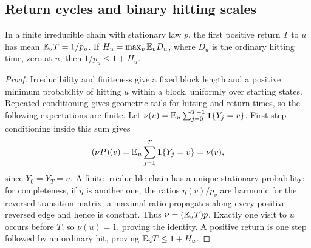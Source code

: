 \subsection{Return cycles and binary hitting scales}

\begin{lemma}\label{lem:kac}
In a finite irreducible chain with stationary law $p$, the first positive
return $T$ to $u$ has mean $\mathbb E_uT=1/p_u$.  If
$H_u=\max_v\mathbb E_vD_u$, where $D_u$ is the ordinary hitting time, zero at
$u$, then $1/p_u\le1+H_u$.
\end{lemma}
\begin{proof}
Irreducibility and finiteness give a fixed block length and a positive
minimum probability of hitting $u$ within a block, uniformly over starting
states.  Repeated conditioning gives geometric tails for hitting and return
times, so the following expectations are finite.  Let
$\nu(v)=\mathbb E_u\sum_{j=0}^{T-1}\mathbf1\{Y_j=v\}$.  First-step conditioning
inside this sum gives
\[
 (\nu P)(v)=\mathbb E_u\sum_{j=1}^{T}\mathbf1\{Y_j=v\}=\nu(v),
\]
since $Y_0=Y_T=u$.  A finite irreducible chain has a unique stationary
probability: for completeness, if $\eta$ is another one, the ratios
$\eta(v)/p_v$ are harmonic for the reversed transition matrix; a maximal
ratio propagates along every positive reversed edge and hence is constant.
Thus $\nu=(\mathbb E_uT)p$.  Exactly one visit to $u$ occurs before $T$, so
$\nu(u)=1$, proving the identity.  A positive return is one step followed
by an ordinary hit, proving $\mathbb E_uT\le1+H_u$.
\end{proof}

